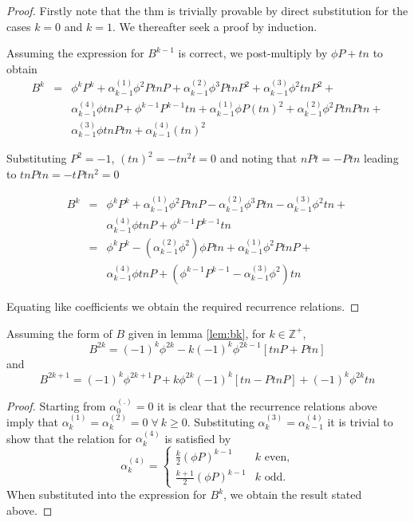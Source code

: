 \begin{proof}
Firstly note that the thm is trivially provable by direct 
substitution for the cases $k=0$ and $k=1$. We thereafter seek a 
proof by induction.

Assuming the expression for $B^{k-1}$ is correct, we post-multiply
by $\phi P+tn$ to obtain
\begin{eqnarray*}
B^k & = & \phi^k P^k + \alpha_{k-1}^{(1)}\phi^2 PtnP + 
          \alpha_{k-1}^{(2)}\phi^3 PtnP^2 + \alpha_{k-1}^{(3)}\phi^2 tnP^2 + \\
    &   & \alpha_{k-1}^{(4)}\phi tnP + \phi^{k-1} P^{k-1} tn + \alpha_{k-1}^{(1)}\phi P(tn)^2 +
          \alpha_{k-1}^{(2)}\phi^2 PtnPtn + \\
    &   & \alpha_{k-1}^{(3)}\phi tnPtn +
	  \alpha_{k-1}^{(4)}(tn)^2
\end{eqnarray*}

Substituting $P^2 = -1$, $(tn)^2 = - tn^2t = 0$ and noting that
$nPt = - Ptn$ leading to $tnPtn = - tPtn^2 = 0$

\begin{eqnarray*}
B^k & = & \phi^k P^k + \alpha_{k-1}^{(1)}\phi^2 PtnP -
          \alpha_{k-1}^{(2)}\phi^3 Ptn - \alpha_{k-1}^{(3)}\phi^2 tn + \\
    &   & \alpha_{k-1}^{(4)}\phi tnP + \phi^{k-1} P^{k-1} tn \\
    & = & \phi^k P^k - (\alpha_{k-1}^{(2)}\phi^2)\phi Ptn +
          \alpha_{k-1}^{(1)}\phi^2 PtnP + \\
    &   & \alpha_{k-1}^{(4)}\phi tnP +
	  (\phi^{k-1} P^{k-1}  - \alpha_{k-1}^{(3)}\phi^2) tn
\end{eqnarray*}

Equating like coefficients we obtain the required recurrence relations.
\end{proof}

\begin{lemma}
\label{lem:bkexp}
Assuming the form of $B$ given in lemma \ref{lem:bk}, for 
$k\in \mathbb{Z}^{+}$,\[
B^{2k}=(-1)^k\phi^{2k}-k(-1)^k\phi^{2k-1}[tnP + Ptn]
\]and\[
B^{2k+1}=(-1)^k\phi^{2k+1}P + k \phi^{2k} (-1)^k [ tn - PtnP ] + (-1)^k\phi^{2k} tn
\]
\end{lemma}
\begin{proof}
Starting from $\alpha _{0}^{(.)}=0$ it is clear that the recurrence
relations above imply that $\alpha _{k}^{(1)}=\alpha _{k}^{(2)}=0\; \forall \: k \ge 0$.
Substituting $\alpha _{k}^{(3)}=\alpha _{k-1}^{(4)}$ it is trivial to show
that the relation for $\alpha _{k}^{(4)}$ is satisfied by \[
\alpha _{k}^{(4)}=\begin{cases}
 \frac{k}{2}(\phi P)^{k-1} & k\textrm{ even,}\\
 \frac{k+1}{2}(\phi P)^{k-1} & k\textrm{ odd.}\end{cases}\]
When substituted into the expression for $B^{k}$, we obtain the
result stated above.
\end{proof}

